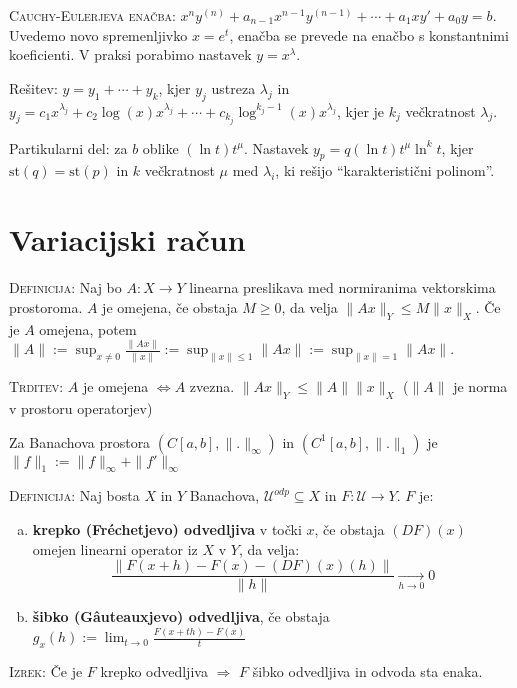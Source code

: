 \documentclass[8pt,a4paper]{amsart}
\theoremstyle{definition} %
\theoremstyle{plain} %
\begin{document}
\textsc{Cauchy-Eulerjeva enačba:} $x^n y^{(n)}+a_{n-1}x^{n-1}y^{(n-1)}+\cdots +
a_1xy' + a_0 y = b$. Uvedemo novo spremenljivko $x = e^t$, enačba se prevede na
enačbo s konstantnimi koeficienti. V praksi porabimo nastavek $y = x^{\lambda}$.

\hspace{3em} Rešitev: $y = y_1+\cdots +y_k$, kjer $y_j$ ustreza $\lambda_j$ in $y_j = c_1
x^{\lambda_j}+c_2 \log(x) x^{\lambda_j}+\cdots + c_{k_j} \log^{k_j -1}(x)
x^{\lambda_j}$, kjer je $k_j$ večkratnost $\lambda_j$.

Partikularni del: za $b$ oblike $(\ln{t})t^{\mu}$. Nastavek $y_p =
q(\ln{t})t^{\mu}\ln^k{t}$, kjer $\text{st}(q)= \text{st}(p)$ in $k$ večkratnost
$\mu$ med $\lambda_i$, ki rešijo ``karakteristični polinom''.


\section*{\textbf{Variacijski račun}}

\textsc{Definicija: }Naj bo $A:X \longrightarrow Y$ linearna preslikava med
normiranima vektorskima prostoroma. $A$ je omejena, če obstaja $M \geq 0$, da
velja $\| Ax \|_Y \leq M \|x \|_X$. Če je $A$ omejena, potem $\| A \| := \sup_{x
\neq 0}{\frac{\| Ax \|}{\| x \|}} := \sup_{\| x\| \leq 1}{\| Ax \|} := \sup_{\|
x\| = 1}{\| Ax \|}$.

\textsc{Trditev:} $A$ je omejena $\Longleftrightarrow A$ zvezna. $\| Ax \|_Y
\leq \|A\| \|x\|_X$ ($\|A\|$ je norma v prostoru operatorjev)

Za Banachova prostora $(C[a,b],\|.\|_\infty)$ in $(C^1[a,b],\|.\|_1)$ je $\|f\|_1 := \|f\|_\infty + \|f'\|_\infty$

\textsc{Definicija: }Naj bosta $X$ in $Y$ Banachova, $\mathcal{U}^{odp} \subseteq X$ in $F:\mathcal{U}\longrightarrow Y$. $F$ je:
\begin{enumerate}[a)]
\item \textbf{krepko (Fréchetjevo) odvedljiva} v točki $x$, če obstaja $(DF)(x)$ omejen linearni operator iz $X$ v $Y$, da velja:
$$ \frac{\|F(x+h)-F(x)-(DF)(x)(h)\|}{\|h\|} \xrightarrow[h \to 0]{} 0 $$

\item \textbf{šibko (Gâuteauxjevo) odvedljiva}, če obstaja
$ g_x(h):= \lim_{t \to 0} \frac{F(x+th)-F(x)}{t} $
\end{enumerate}

\textsc{Izrek:} Če je $F$ krepko odvedljiva $\Longrightarrow$ $F$ šibko odvedljiva in odvoda sta enaka.
\end{document}
